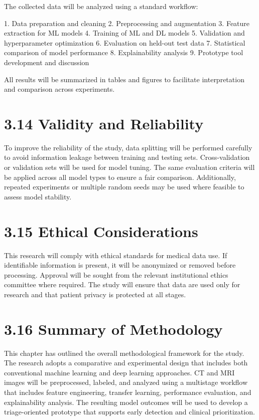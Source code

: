 \documentclass[12pt,a4paper]{report}
\begin{document}
The collected data will be analyzed using a standard workflow:

1. Data preparation and cleaning
2. Preprocessing and augmentation
3. Feature extraction for ML models
4. Training of ML and DL models
5. Validation and hyperparameter optimization
6. Evaluation on held-out test data
7. Statistical comparison of model performance
8. Explainability analysis
9. Prototype tool development and discussion

All results will be summarized in tables and figures to facilitate interpretation and comparison across experiments.

\section{3.14 Validity and Reliability}

To improve the reliability of the study, data splitting will be performed carefully to avoid information leakage between training and testing sets. Cross-validation or validation sets will be used for model tuning. The same evaluation criteria will be applied across all model types to ensure a fair comparison. Additionally, repeated experiments or multiple random seeds may be used where feasible to assess model stability.

\section{3.15 Ethical Considerations}

This research will comply with ethical standards for medical data use. If identifiable information is present, it will be anonymized or removed before processing. Approval will be sought from the relevant institutional ethics committee where required. The study will ensure that data are used only for research and that patient privacy is protected at all stages.

\section{3.16 Summary of Methodology}

This chapter has outlined the overall methodological framework for the study. The research adopts a comparative and experimental design that includes both conventional machine learning and deep learning approaches. CT and MRI images will be preprocessed, labeled, and analyzed using a multistage workflow that includes feature engineering, transfer learning, performance evaluation, and explainability analysis. The resulting model outcomes will be used to develop a triage-oriented prototype that supports early detection and clinical prioritization.
\end{document}
